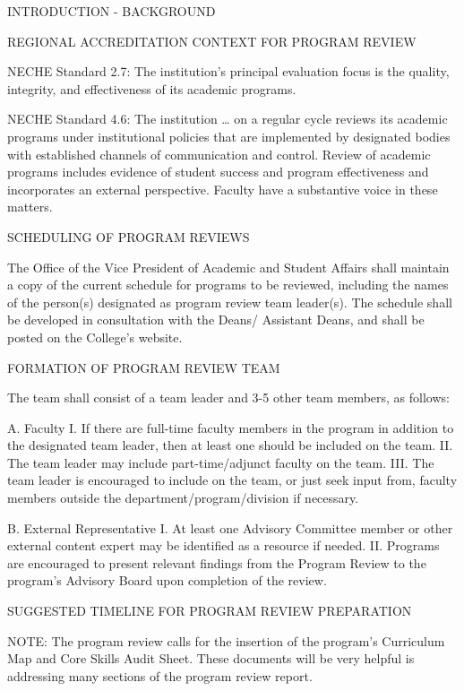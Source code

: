 INTRODUCTION - BACKGROUND

REGIONAL ACCREDITATION CONTEXT FOR PROGRAM REVIEW 

NECHE Standard 2.7: The institution’s principal evaluation focus is the quality, integrity, and effectiveness of its academic programs. 

NECHE Standard 4.6: The institution … on a regular cycle reviews its academic programs under institutional policies that are implemented by designated bodies with established channels of communication and control. Review of academic programs includes evidence of student success and program effectiveness and incorporates an external perspective. Faculty have a substantive voice in these matters. 


SCHEDULING OF PROGRAM REVIEWS 

The Office of the Vice President of Academic and Student Affairs shall maintain a copy of the current schedule for programs to be reviewed, including the names of the person(s) designated as program review team leader(s). The schedule shall be developed in consultation with the Deans/ Assistant Deans, and shall be posted on the College’s website. 

FORMATION OF PROGRAM REVIEW TEAM 

The team shall consist of a team leader and 3-5 other team members, as follows: 

A. Faculty 
I. If there are full-time faculty members in the program in addition to the designated team leader, then at least one should be included on the team. 
II. The team leader may include part-time/adjunct faculty on the team.
III. The team leader is encouraged to include on the team, or just seek input from, faculty members outside the department/program/division if necessary.

B. External Representative 
I. At least one Advisory Committee member or other external content expert may be identified as a resource if needed. 
II. Programs are encouraged to present relevant findings from the Program Review to the program’s Advisory Board upon completion of the review.

SUGGESTED TIMELINE FOR PROGRAM REVIEW PREPARATION 

NOTE: The program review calls for the insertion of the program’s Curriculum Map and Core Skills Audit Sheet. These documents will be very helpful is addressing many sections of the program review report.

